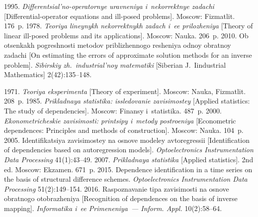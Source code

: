   \begin{multicols}{2}

\renewcommand{\bibname}{\protect\rmfamily References}

{\small\frenchspacing
 {%
 \begin{thebibliography}{99}
 
 \vspace*{-4pt}
 
   1995.  
\textit{Differentsial'no-operatornye uravneniya i~nekorrektnye zadachi} 
[Differential-operator equations and ill-posed problems]. Moscow: Fizmatlit. 
176~p.
   1978. \textit{Teoriya 
lineynykh nekorrektnykh zadach i~ee prilozheniya} [Theory of linear ill-posed 
problems and its applications]. Moscow: Nauka. 206~p.
   2010. Ob otsenkakh po\-gresh\-nosti metodov 
priblizhennogo resheniya odnoy obratnoy zadachi 
[On estimating the errors of approximate solution 
methods for an inverse problem]. \textit{Sibirskiy zh.~industrial'noy 
matematiki} [Siberian J.~Iindustrial Mathematics] 2(42):135--148.

   1971. \textit{Teoriya eksperimenta} [Theory of experiment]. 
Moscow: Nauka, Fizmatlit. 208~p.
   1985. 
\textit{Prikladnaya statistika: issledovanie zavisimostey} [Applied statistics: The 
study of dependencies]. Moscow: Finansy i~statistika. 487~p.
   2000. \textit{Eko\-no\-met\-ri\-che\-skie 
zavisimosti: printsipy i~metody postroeniya} [Econometric dependences: Principles 
and methods of construction]. Moscow: Nauka. 104~p.
   2005. Identifikatsiya zavisimostey na osno\-ve modeley 
avtoregressii [Identification of dependencies based on autoregression models]. 
\textit{Optoelectronics Instrumentation Data Processing} 
41(1):43--49.
   2007. \textit{Prikladnaya statistika} [Applied statistics]. 2nd ed. 
Moscow: Ekzamen. 671~p.
   2015.  
Dependence identification in a time series on the basis of structural difference 
schemes. \textit{Optoelectronics Instrumentation Data 
Processing} 51(2):149--154.
   2016. Raspoznavanie tipa 
zavisimosti na osnove obratnogo otobrazheniya [Recognition of dependences on the 
basis of inverse mapping]. \textit{Informatika i~ee Primeneniya~--- Inform. 
\mbox{Appl}.}  10(2):58--64.
  

\end{thebibliography}}}
\end{multicols}
